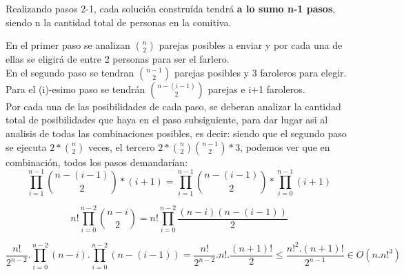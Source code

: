 \vspace*{1em}

Realizando pasos 2-1, cada solución construída tendrá {\bf a lo sumo n-1 pasos}, siendo n la cantidad total de personas en la comitiva.

En el primer paso se analizan $\binom {n}{2}$ parejas posibles a enviar y por cada una de ellas se eligirá de entre 2 personas para ser el farlero.\\

En el segundo paso se tendran $\binom {n-1}{2}$ parejas posibles y 3 faroleros para elegir.\\

Para el (i)-esimo paso se tendrán $\binom {n-(i-1)}{2}$ parejas e i+1 faroleros.\\

Por cada una de las posibilidades de cada paso, se deberan analizar la cantidad total de
posibilidades que haya en el paso subsiguiente, para dar lugar asi al analisis de todas las combinaciones posibles, es decir: siendo que el segundo paso se ejecuta $2 \ast \binom {n}{2}$ veces, el tercero $2 \ast \binom {n}{2} \binom{n-1} {2} \ast 3$, podemos ver que en combinación, todos los pasos demandarían:
\[
\prod_{i=1}^{n-1}\binom {n-(i-1)}{2}*(i+1) = \prod_{i=1}^{n-1}\binom {n-(i-1)}{2} * \prod_{i=0}^{n-1}(i+1)
\]

\[
n!\prod_{i=0}^{n-2}\binom {n-i}{2} = n!\prod_{i=0}^{n-2}\frac{(n-i)(n-(i-1))}{2}
\]

\[
\frac{ n!}{2^{n-2}}.\prod_{i=0}^{n-2}(n-i).\prod_{i=0}^{n-2}(n-(i-1)) = \frac{n!}{2^{n-2}}.n!.\frac{(n+1)!}{2}\leq \frac{n!^{2}.(n+1)!}{2^{n-1}}\in O(n.n!^{3})
\]